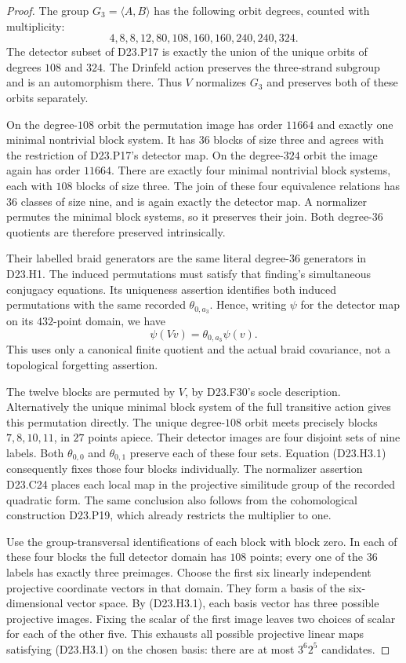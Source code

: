 \begin{proof}
The group $G_3=\langle A,B\rangle$ has the following orbit
degrees, counted with multiplicity:
\[
                 4,8,8,12,80,108,160,160,240,240,324.
\]
The detector subset of D23.P17 is exactly the union of the
unique orbits of degrees $108$ and $324$. The Drinfeld action
preserves the three-strand subgroup and is an automorphism
there. Thus $V$ normalizes $G_3$ and preserves both of these
orbits separately.

On the degree-$108$ orbit the permutation image has order
$11664$ and exactly one minimal nontrivial block system.
It has $36$ blocks of size three and agrees with the
restriction of D23.P17's detector map. On the degree-$324$
orbit the image again has order $11664$. There are exactly
four minimal nontrivial block systems, each with $108$ blocks
of size three. The join of these four equivalence relations
has $36$ classes of size nine, and is again exactly the
detector map. A normalizer permutes the minimal block
systems, so it preserves their join. Both degree-$36$
quotients are therefore preserved intrinsically.

Their labelled braid generators are the same literal
degree-$36$ generators in D23.H1. The induced permutations
must satisfy that finding's simultaneous conjugacy equations.
Its uniqueness assertion identifies both induced permutations
with the same recorded $\theta_{0,a_3}$. Hence, writing $\psi$
for the detector map on its $432$-point domain, we have
\[
                      \psi(Vv)=\theta_{0,a_3}\psi(v).
\tag{D23.H3.1}
\]
This uses only a canonical finite quotient and the actual
braid covariance, not a topological forgetting assertion.

The twelve blocks are permuted by $V$, by D23.F30's socle
description. Alternatively the unique minimal block system
of the full transitive action gives this permutation directly.
The unique degree-$108$ orbit meets precisely blocks
$7,8,10,11$, in $27$ points apiece. Their detector images are
four disjoint sets of nine labels. Both
$\theta_{0,0}$ and $\theta_{0,1}$ preserve each of these four
sets. Equation (D23.H3.1) consequently fixes those four
blocks individually. The normalizer assertion D23.C24
places each local map in the projective similitude group of
the recorded quadratic form. The same conclusion also
follows from the cohomological construction D23.P19, which
already restricts the multiplier to one.

Use the group-transversal identifications of each block with
block zero. In each of these four blocks the full detector
domain has $108$ points; every one of the $36$ labels has
exactly three preimages. Choose the first six linearly
independent projective coordinate vectors in that domain.
They form a basis of the six-dimensional vector space.
By (D23.H3.1), each basis vector has three possible projective
images. Fixing the scalar of the first image leaves two
choices of scalar for each of the other five. This exhausts
all possible projective linear maps satisfying (D23.H3.1)
on the chosen basis: there are at most $3^6 2^5$ candidates.


\end{proof}
